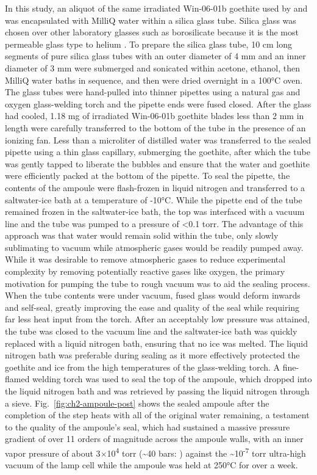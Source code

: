 In this study, an aliquot of the same irradiated Win-06-01b goethite
used by \citet{monteiro2017} and \citet{farley2024} was encapsulated with
MilliQ water within a silica glass tube. Silica glass was chosen over
other laboratory glasses such as borosilicate because it is the most
permeable glass type to helium \citep{norton1953,altemose1961}. To
prepare the silica glass tube, 10 cm long segments of pure silica glass
tubes with an outer diameter of 4 mm and an inner diameter of 3 mm were
submerged and sonicated within acetone, ethanol, then MilliQ water baths
in sequence, and then were dried overnight in a 100°C oven. The glass
tubes were hand-pulled into thinner pipettes using a natural gas and
oxygen glass-welding torch and the pipette ends were fused closed. After
the glass had cooled, 1.18 mg of irradiated Win-06-01b goethite blades
less than 2 mm in length were carefully transferred to the bottom of the
tube in the presence of an ionizing fan. Less than a microliter of
distilled water was transferred to the sealed pipette using a thin glass
capillary, submerging the goethite, after which the tube was gently
tapped to liberate the bubbles and ensure that the water and goethite
were efficiently packed at the bottom of the pipette. To seal the
pipette, the contents of the ampoule were flash-frozen in liquid
nitrogen and transferred to a saltwater-ice bath at a temperature of
-10°C. While the pipette end of the tube remained frozen in the
saltwater-ice bath, the top was interfaced with a vacuum line and the
tube was pumped to a pressure of \textless0.1 torr. The advantage of
this approach was that water would remain solid within the tube, only
slowly sublimating to vacuum while atmospheric gases would be readily
pumped away. While it was desirable to remove atmospheric gases to
reduce experimental complexity by removing potentially reactive gases
like oxygen, the primary motivation for pumping the tube to rough vacuum
was to aid the sealing process. When the tube contents were under
vacuum, fused glass would deform inwards and self-seal, greatly
improving the ease and quality of the seal while requiring far less heat
input from the torch. After an acceptably low pressure was attained, the
tube was closed to the vacuum line and the saltwater-ice bath was
quickly replaced with a liquid nitrogen bath, ensuring that no ice was
melted. The liquid nitrogen bath was preferable during sealing as it
more effectively protected the goethite and ice from the high
temperatures of the glass-welding torch. A fine-flamed welding torch was
used to seal the top of the ampoule, which dropped into the liquid
nitrogen bath and was retrieved by passing the liquid nitrogen through a
sieve. Fig.~\ref{fig:ch2-ampoule-post} shows the sealed ampoule after the completion of the
step heats with all of the original water remaining, a testament to the
quality of the ampoule's seal, which had sustained a massive pressure
gradient of over 11 orders of magnitude across the ampoule walls, with
an inner vapor pressure of about 3$\times$10\textsuperscript{4} torr
(\textasciitilde40 bars: \citet{haar1984}) against the
\textasciitilde10\textsuperscript{-7} torr ultra-high vacuum of the lamp
cell while the ampoule was held at 250°C for over a week.

